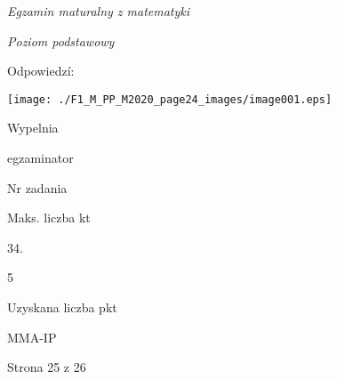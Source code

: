 \documentclass[a4paper,12pt]{article}
\begin{document}
{\it Egzamin maturalny z matematyki}

{\it Poziom podstawowy}

Odpowiedzí:
\begin{center}
\texttt{[image: ./F1\_M\_PP\_M2020\_page24\_images/image001.eps]}
\end{center}
Wypelnia

egzaminator

Nr zadania

Maks. liczba kt

34.

5

Uzyskana liczba pkt

MMA-IP

Strona 25 z 26
\end{document}
